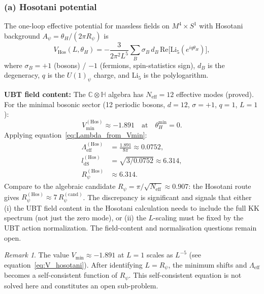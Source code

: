 \documentclass[11pt,a4paper]{article}
\theoremstyle{definition}
\theoremstyle{remark}
\newtheorem{remark}{Remark}
\begin{document}
\subsubsection*{(a) Hosotani potential}

The one-loop effective potential for massless fields on $M^4\times S^1$
with Hosotani background $A_\psi = \theta_H/(2\pi R_\psi)$ is
\begin{equation}
  V_{\mathrm{Hos}}(L,\theta_H)
  = -\frac{3}{2\pi^2 L^5}
    \sum_B \sigma_B\,d_B\,\mathrm{Re}\bigl[\mathrm{Li}_5(e^{iq\theta_H})\bigr],
  \label{eq:V_hosotani}
\end{equation}
where $\sigma_B = +1$ (bosons) / $-1$ (fermions, spin-statistics sign),
$d_B$ is the degeneracy,
$q$ is the $U(1)_\psi$ charge, and $\mathrm{Li}_5$ is the polylogarithm.

\textbf{UBT field content:}
The $\mathbb{C}\otimes\mathbb{H}$ algebra has $N_{\mathrm{eff}} = 12$
effective modes (proved).  For the minimal bosonic sector
(12 periodic bosons, $d=12$, $\sigma=+1$, $q=1$, $L=1$):
\begin{equation}
  V_{\min}^{(\mathrm{Hos})} \approx -1.891
  \quad\text{at}\quad
  \theta_H^{\min} = 0.
  \label{eq:Vmin_hosotani}
\end{equation}
Applying equation~\eqref{eq:Lambda_from_Vmin}:
\begin{align}
  \Lambda_{\mathrm{eff}}^{(\mathrm{Hos})}
    &= \frac{1.891}{8\pi} \approx 0.0752,
  \label{eq:Lambda_hosotani} \\
  l_{\mathrm{dS}}^{(\mathrm{Hos})}
    &= \sqrt{3/0.0752} \approx 6.314,
  \label{eq:ldS_hosotani} \\
  R_\psi^{(\mathrm{Hos})}
    &\approx 6.314.
  \label{eq:Rpsi_hosotani}
\end{align}
Compare to the algebraic candidate $R_\psi = \pi/\sqrt{N_{\mathrm{eff}}}
\approx 0.907$: the Hosotani route gives $R_\psi^{(\mathrm{Hos})} \approx 7\,R_\psi^{(\mathrm{cand})}$.  The discrepancy is significant and signals
that either (i) the UBT field content in the Hosotani calculation needs
to include the full KK spectrum (not just the zero mode), or (ii) the
$L$-scaling must be fixed by the UBT action normalization.
The field-content and normalisation questions remain open.

\begin{remark}
  The value $V_{\min} \approx -1.891$ at $L=1$ scales as $L^{-5}$
  (see equation~\eqref{eq:V_hosotani}).
  After identifying $L = R_\psi$, the minimum shifts and
  $\Lambda_{\mathrm{eff}}$ becomes a self-consistent function of $R_\psi$.
  This self-consistent equation is not solved here and constitutes
  an open sub-problem.
\end{remark}
\end{document}
